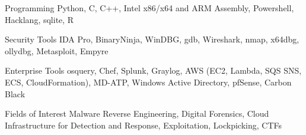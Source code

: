 


\begin{cvskills}


\cvskill
{Programming} %
{Python, C, C++, Intel x86/x64 and ARM Assembly, Powershell, Hacklang, sqlite, R} %


\cvskill
{Security Tools} %
{IDA Pro, BinaryNinja, WinDBG, gdb, Wireshark, nmap, x64dbg, ollydbg, Metasploit, Empyre} %


\cvskill
{Enterprise Tools} %
{osquery, Chef, Splunk, Graylog, AWS (EC2, Lambda, SQS SNS, ECS, CloudFormation), MD-ATP, Windows Active Directory, pfSense, Carbon Black} %


\cvskill
{Fields of Interest} %
{Malware Reverse Engineering, Digital Forensics, Cloud Infrastructure for Detection and Response, Exploitation, Lockpicking, CTFs} %


\end{cvskills}
